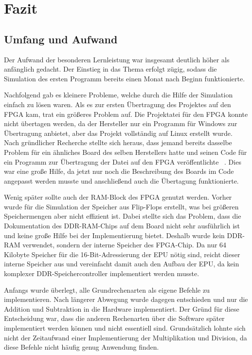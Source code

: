 \chapter{Fazit}
\label{c:fazit}
\section{Umfang und Aufwand}
Der Aufwand der besonderen Lernleistung war insgesamt deutlich höher als
anfänglich gedacht. Der Einstieg in das Thema erfolgt zügig, sodass die
Simulation des ersten Programm bereits einen Monat nach Beginn funktionierte.

Nachfolgend gab es kleinere Probleme, welche durch die Hilfe der Simulation
einfach zu lösen waren. Als es zur ersten Übertragung des Projektes auf den
\ac{FPGA} kam, trat ein größeres Problem auf. Die Projektatei für den \ac{FPGA}
konnte nicht übertagen werden, da der Hersteller nur ein Programm für Windows
zur Übertragung anbietet, aber das Projekt vollständig auf Linux erstellt wurde.
Nach gründlicher Recherche stellte sich heraus, dass jemand bereits dasselbe
Problem für ein ähnliches Board des selben Herstellers hatte und seinen Code für
ein Programm zur Übertragung der Datei auf den \ac{FPGA} veröffentlichte
~\cite{numatoloader}. Dies war eine große Hilfe, da jetzt nur noch die
Beschreibung des Boards im Code angepasst werden musste und anschließend auch
die Übertagung funktionierte.

Wenig später sollte auch der RAM-Block des \ac{FPGA} genutzt werden. Vorher
wurde für die Simulation der Speicher aus Flip-Flops erstellt, was bei größeren
Speichermengen aber nicht effizient ist. Dabei stellte sich das Problem, dass
die Dokumentation des DDR-RAM-Chips auf dem Board nicht sehr ausführlich ist und
keine große Hilfe bei der Implementierung bietet. Deshalb wurde kein DDR-RAM
verwendet, sondern der interne Speicher des \ac{FPGA}-Chip. Da nur 64 Kilobyte
Speicher für die 16-Bit-Adressierung der \ac{EPU} nötig sind, reicht dieser
interne Speicher aus und vereinfacht damit auch den Aufbau der \ac{EPU}, da kein
komplexer DDR-Speichercontroller implementiert werden musste.

Anfangs wurde überlegt, alle Grundrechenarten als eigene Befehle zu
implementieren. Nach längerer Abwegung wurde dagegen entschieden und nur die
Addition und Subtraktion in die Hardware implementiert. Der Gründ für diese
Entscheidung war, dass die anderen Rechenarten über die Software später
implementiert werden können und nicht essentiell sind. Grundsätzlich lohnte sich
nicht der Zeitaufwand einer Implementierung der Multiplikation und
Division, da diese Befehle nicht häufig genug Anwendung finden.

